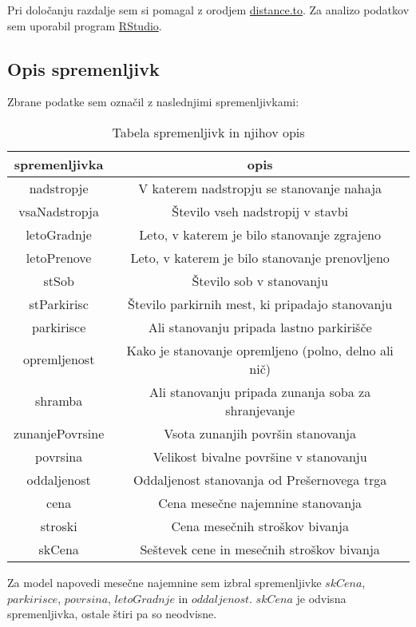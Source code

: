 \documentclass[a4paper, 12pt]{article}
\begin{document}
Pri določanju razdalje sem si pomagal z orodjem
\href{https://www.distance.to/}{distance.to}. Za analizo podatkov sem uporabil
program \href{https://rstudio.com/}{RStudio}.

\subsection{Opis spremenljivk}

Zbrane podatke sem označil z naslednjimi spremenljivkami:
\begin{table}[h]
\begin{center}
\caption{Tabela spremenljivk in njihov opis}
\label{table:1}
\begin{tabular}{ c|c}
	spremenljivka & opis \\
	\hline
	\hline
	nadstropje & V katerem nadstropju se stanovanje nahaja \\
	\hline
	vsaNadstropja & Število vseh nadstropij v stavbi \\
	\hline
	letoGradnje & Leto, v katerem je bilo stanovanje zgrajeno \\
	\hline
	letoPrenove & Leto, v katerem je bilo stanovanje prenovljeno \\
	\hline
	stSob & Število sob v stanovanju \\
	\hline
	stParkirisc & Število parkirnih mest, ki pripadajo stanovanju \\
	\hline
	parkirisce & Ali stanovanju pripada lastno parkirišče \\
	\hline
	opremljenost & Kako je stanovanje opremljeno (polno, delno ali nič) \\
	\hline
	shramba & Ali stanovanju pripada zunanja soba za shranjevanje \\
	\hline
	zunanjePovrsine & Vsota zunanjih površin stanovanja \\
	\hline
	povrsina & Velikost bivalne površine v stanovanju \\
	\hline
	oddaljenost & Oddaljenost stanovanja od Prešernovega trga \\
	\hline
	cena & Cena mesečne najemnine stanovanja \\
	\hline
	stroski & Cena mesečnih stroškov bivanja \\
	\hline
	skCena & Seštevek cene in mesečnih stroškov bivanja \\
\end{tabular}
\end{center}
\end{table}

Za model napovedi mesečne najemnine sem izbral spremenljivke $ skCena $,
$ parkirisce $, $ povrsina $, $ letoGradnje $ in
$ oddaljenost $. $ skCena $ je odvisna spremenljivka, ostale štiri pa
so neodvisne.
\end{document}
